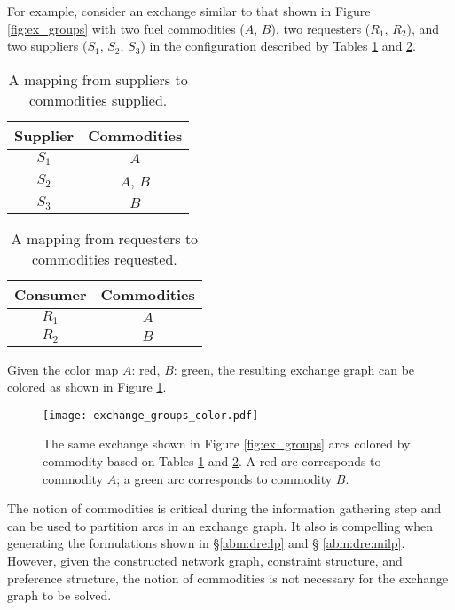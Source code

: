 For example, consider an exchange similar to that shown in Figure
\ref{fig:ex_groups} with two fuel commodities ($A$, $B$), two requesters ($R_1$,
$R_2$), and two suppliers ($S_1$, $S_2$, $S_3$) in the configuration described
by Tables \ref{tbl:ex_sup} and \ref{tbl:ex_req}.

\begin{table}[h]
\centering
\begin{tabular}{c|c}
Supplier & Commodities \\ \hline
$S_1$             & $A$         \\
$S_2$             & $A$, $B$    \\
$S_3$             & $B$         \\
\end{tabular}
\caption{A mapping from suppliers to commodities supplied.}
\label{tbl:ex_sup}
\end{table}

\begin{table}[h]
\centering
\begin{tabular}{c|c}
Consumer & Commodities \\ \hline
$R_1$             & $A$         \\
$R_2$             & $B$        
\end{tabular}
\caption{A mapping from requesters to commodities requested.}
\label{tbl:ex_req}
\end{table}

Given the color map $A$: red, $B$: green, the resulting exchange
graph can be colored as shown in Figure \ref{fig:ex_groups_color}.

\begin{figure}
  \begin{center}
    \texttt{[image: exchange\_groups\_color.pdf]}
    \caption{The same exchange shown in Figure \ref{fig:ex_groups} arcs colored
      by commodity based on Tables \ref{tbl:ex_sup} and \ref{tbl:ex_req}. A red
      arc corresponds to commodity $A$; a green arc corresponds to commodity
      $B$.}
    \label{fig:ex_groups_color}
  \end{center}
\end{figure}

The notion of commodities is critical during the information gathering step and
can be used to partition arcs in an exchange graph. It also is compelling when
generating the formulations shown in \S \ref{abm:dre:lp} and \S
\ref{abm:dre:milp}. However, given the constructed network graph, constraint
structure, and preference structure, the notion of commodities is not necessary
for the exchange graph to be solved.

